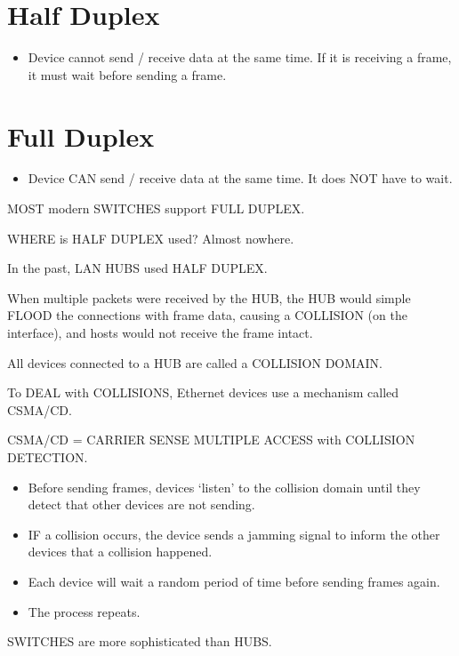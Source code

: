 \section{Half Duplex}\label{half-duplex}

\begin{itemize}
\tightlist
\item
  Device cannot send / receive data at the same time. If it is receiving
  a frame, it must wait before sending a frame.
\end{itemize}

\section{Full Duplex}\label{full-duplex}

\begin{itemize}
\tightlist
\item
  Device CAN send / receive data at the same time. It does NOT have to
  wait.
\end{itemize}

MOST modern SWITCHES support FULL DUPLEX.

WHERE is HALF DUPLEX used? Almost nowhere.

In the past, LAN HUBS used HALF DUPLEX.

When multiple packets were received by the HUB, the HUB would simple
FLOOD the connections with frame data, causing a COLLISION (on the
interface), and hosts would not receive the frame intact.

All devices connected to a HUB are called a COLLISION DOMAIN.

To DEAL with COLLISIONS, Ethernet devices use a mechanism called
CSMA/CD.

CSMA/CD = CARRIER SENSE MULTIPLE ACCESS with COLLISION DETECTION.

\begin{itemize}
\tightlist
\item
  Before sending frames, devices `listen' to the collision domain until
  they detect that other devices are not sending.
\item
  IF a collision occurs, the device sends a jamming signal to inform the
  other devices that a collision happened.
\item
  Each device will wait a random period of time before sending frames
  again.
\item
  The process repeats.
\end{itemize}

SWITCHES are more sophisticated than HUBS.

